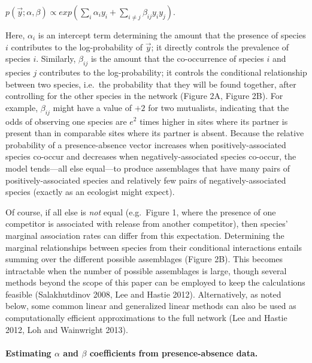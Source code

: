 \documentclass[12pt,]{article}
\begin{document}
\begin{spacing}{1.9}
\begin{flushleft}
\centering

\(p(\vec{y}; \alpha, \beta) \propto exp(\sum_{i}\alpha_i y_i + \sum_{i\neq j}\beta_{ij}y_i y_j).\)

\raggedright
\setlength{\parindent}{1cm}

Here, \(\alpha_{i}\) is an intercept term determining the amount that
the presence of species \(i\) contributes to the log-probability of
\(\vec{y}\); it directly controls the prevalence of species \(i\).
Similarly, \(\beta_{ij}\) is the amount that the co-occurrence of
species \(i\) and species \(j\) contributes to the log-probability; it
controls the conditional relationship between two species, i.e.~the
probability that they will be found together, after controlling for the
other species in the network (Figure 2A, Figure 2B). For example,
\(\beta_{ij}\) might have a value of \(+2\) for two mutualists,
indicating that the odds of observing one species are \(e^2\) times
higher in sites where its partner is present than in comparable sites
where its partner is absent. Because the relative probability of a
presence-absence vector increases when positively-associated species
co-occur and decreases when negatively-associated species co-occur, the
model tends---all else equal---to produce assemblages that have many
pairs of positively-associated species and relatively few pairs of
negatively-associated species (exactly as an ecologist might expect).

Of course, if all else is \emph{not} equal (e.g.~Figure 1, where the
presence of one competitor is associated with release from another
competitor), then species' marginal association rates can differ from
this expectation. Determining the marginal relationships between species
from their conditional interactions entails summing over the different
possible assemblages (Figure 2B). This becomes intractable when the
number of possible assemblages is large, though several methods beyond
the scope of this paper can be employed to keep the calculations
feasible (Salakhutdinov 2008, Lee and Hastie 2012). Alternatively, as
noted below, some common linear and generalized linear methods can also
be used as computationally efficient approximations to the full network
(Lee and Hastie 2012, Loh and Wainwright 2013).

\paragraph{\texorpdfstring{Estimating \(\alpha\) and \(\beta\)
coefficients from presence-absence
data.}{Estimating \textbackslash{}alpha and \textbackslash{}beta coefficients from presence-absence data.}}\label{estimating-alpha-and-beta-coefficients-from-presence-absence-data.}


\end{flushleft}
\end{spacing}
\end{document}
